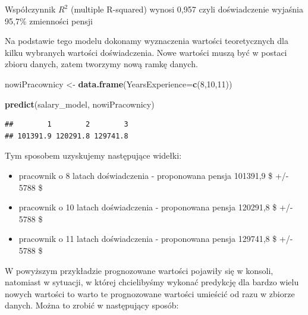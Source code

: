 \documentclass[]{book}
\newenvironment{Shaded}{\begin{snugshade}}{\end{snugshade}}
\newcommand{\DataTypeTok}[1]{\textcolor[rgb]{0.13,0.29,0.53}{#1}}
\newcommand{\DecValTok}[1]{\textcolor[rgb]{0.00,0.00,0.81}{#1}}
\newcommand{\KeywordTok}[1]{\textcolor[rgb]{0.13,0.29,0.53}{\textbf{#1}}}
\newcommand{\NormalTok}[1]{#1}
\newcommand{\OperatorTok}[1]{\textcolor[rgb]{0.81,0.36,0.00}{\textbf{#1}}}
\newcommand{\StringTok}[1]{\textcolor[rgb]{0.31,0.60,0.02}{#1}}
\providecommand{\tightlist}{%
  \setlength{\itemsep}{0pt}\setlength{\parskip}{0pt}}
\begin{document}
Współczynnik \(R^2\) (multiple R-squared) wynosi 0,957 czyli doświadczenie wyjaśnia 95,7\% zmienności pensji

Na podstawie tego modelu dokonamy wyznaczenia wartości teoretycznych dla kilku wybranych wartości doświadczenia. Nowe wartości muszą być w postaci zbioru danych, zatem tworzymy nową ramkę danych.

\begin{Shaded}
\begin{Highlighting}[]
\NormalTok{nowiPracownicy <-}\StringTok{ }\KeywordTok{data.frame}\NormalTok{(}\DataTypeTok{YearsExperience=}\KeywordTok{c}\NormalTok{(}\DecValTok{8}\NormalTok{,}\DecValTok{10}\NormalTok{,}\DecValTok{11}\NormalTok{))}

\KeywordTok{predict}\NormalTok{(salary_model, nowiPracownicy)}
\end{Highlighting}
\end{Shaded}

\begin{verbatim}
##        1        2        3 
## 101391.9 120291.8 129741.8
\end{verbatim}

Tym sposobem uzyskujemy następujące widełki:

\begin{itemize}
\tightlist
\item
  pracownik o 8 latach doświadczenia - proponowana pensja 101391,9 \$ +/- 5788
  \$
\item
  pracownik o 10 latach doświadczenia - proponowana pensja 120291,8 \$ +/- 5788
  \$
\item
  pracownik o 11 latach doświadczenia - proponowana pensja 129741,8 \$ +/- 5788
  \$
\end{itemize}

W powyższym przykładzie prognozowane wartości pojawiły się w konsoli, natomiast w sytuacji, w której chcielibyśmy wykonać predykcję dla bardzo wielu nowych wartości to warto te prognozowane wartości umieścić od razu w zbiorze danych. Można to zrobić w następujący sposób:

\begin{Shaded}
\end{Shaded}
\end{document}
